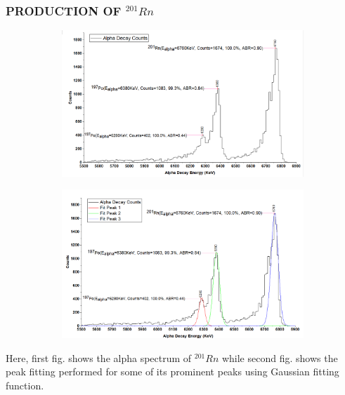 \documentclass[12pt]{article}
\begin{document}
\subsubsection{PRODUCTION OF $^{201}Rn$}
\begin{figure}[h]
\centering
 \begin{subfigure}
\centering
\includegraphics[scale=0.5]{Rn201.png}
\end{subfigure}
\hfill
\begin{subfigure}
\centering
\includegraphics[scale=0.5]{Rn201(Peak Fitting).png}
\end{subfigure}
\label{First fig shows the alpha spectrum of Rn 201 and second fig shows the peak fitting for its prominent peaks.}
\end{figure}
Here, first fig. shows the alpha spectrum of $^{201}Rn$ while second fig. shows the peak fitting performed for some of its prominent peaks using Gaussian fitting function.
\clearpage
\end{document}
